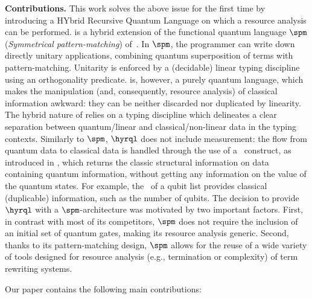 \medskip
\noindent
\textbf{Contributions. }
This work solves the above issue for the first time by introducing a HYbrid
Recursive Quantum Language \hyrql{} on which a resource analysis can be
performed. \hyrql{} is a hybrid extension of the functional quantum language
$\spm$ (\emph{Symmetrical pattern-matching}) of~\cite{SVV18,Lem24}. In $\spm$,
the programmer can write down directly unitary applications, combining quantum
superposition of terms with pattern-matching. Unitarity is enforced by a
(decidable) linear typing discipline using an orthogonality predicate. \spm{}
is, however, a purely quantum language, which makes the manipulation (and,
consequently, resource analysis) of classical information awkward: they can be
neither discarded nor duplicated by linearity. The hybrid nature of \hyrql{}
relies on a typing discipline which delineates a clear separation between
quantum/linear and classical/non-linear data in the typing contexts. Similarly
to $\spm$, $\hyrql$ does not include measurement: the flow from quantum data to
classical data is handled through the use of a \textshape\ construct,  as
introduced in \cite{GLRSV13}, which returns the classic structural information
on data containing quantum information, without getting any information on the
value of the quantum states. For example, the  \textshape\ of a qubit list
provides classical (duplicable) information, such as the number of qubits. The
decision to provide $\hyrql$ with a $\spm$-architecture was motivated by two
important factors. First, in contrast with most of its competitors, $\spm$ does
not require the inclusion of an initial set of quantum gates, making its
resource analysis generic. Second, thanks to its pattern-matching design, $\spm
$ allows for the reuse of a wide variety of tools designed for resource
analysis (e.g., termination or complexity) of term rewriting systems.

Our paper contains the following main contributions:

